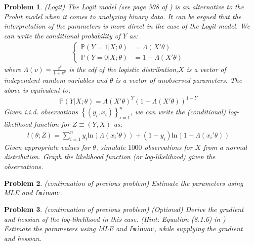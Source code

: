 \documentclass[12pt, a4paper]{article}
\newcommand{\e}[1]{\text{e}^{#1}}
\newcommand{\Set}[1]{\left\{#1\right\}}
\renewcommand{\ln}[1]{\text{ln}\left(#1\right)}
\newtheorem{problem}{Problem}
\begin{document}
\begin{problem}
(Logit)
The Logit model (see page 508 of \citet{H2000}) is an alternative to the Probit model when it comes to analyzing binary data.
It can be argued that the interpretation of the parameters is more direct in the case of the Logit model.
We can write the conditional probability of \(Y\) as:
\begin{align*}
  \begin{cases}
    \mathbb{P}(Y=1\vert X; \theta) &= \Lambda(X'\theta)\\
    \mathbb{P}(Y=0\vert X; \theta) &= 1 - \Lambda(X'\theta)
  \end{cases}
\end{align*}
where \(\Lambda(v)=\frac{\e{v}}{1+\e{v}}\) is the cdf of the logistic distribution,\(X\) is a vector of independent random variables and \(\theta\) is a vector of unobserved parameters.
The above is equivalent to:
\begin{align*}
\mathbb{P}(Y\vert X;\theta)={\Lambda(X'\theta)}^Y(1-\Lambda(X'\theta))^{1-Y}
\end{align*}
Given i.i.d. observations \(\Set{(y_i, x_i)}_{i=1}^n\), we can write the (conditional) log-likelihood function for \(Z\equiv(Y,X)\) as:
\begin{align*}
l(\theta; Z)=\sum_{i=1}^n y_i\ln{\Lambda(x_i'\theta)} + (1-y_i)\ln{1-\Lambda(x_i'\theta)}
\end{align*}
Given appropriate values for \(\theta\), simulate \(1000\) observations for \(X\) from a normal distribution.
Graph the likelihood function (or log-likelihood) given the observations.
\end{problem}

\begin{problem}
(continuation of previous problem)
Estimate the parameters using MLE and \texttt{fminunc}.
\end{problem}

\begin{problem}
(continuation of previous problem) (Optional)
Derive the gradient and hessian of the log-likelihood in this case. (Hint: Equation (8.1.6) in \citet{H2000})
Estimate the parameters using MLE and \texttt{fminunc}, while supplying the gradient and hessian.
\end{problem}
\end{document}
